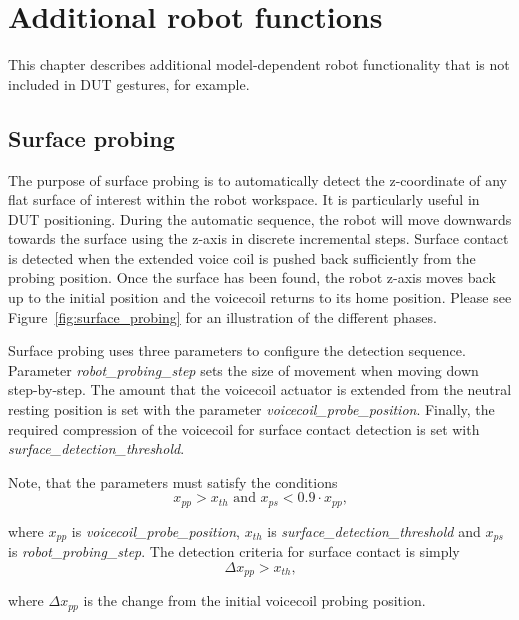 \chapter{Additional robot functions}
This chapter describes additional model-dependent robot functionality that is not included in DUT gestures, for example.

\section{Surface probing}

The purpose of surface probing is to automatically detect the z-coordinate of any flat surface of interest within the robot workspace. It is particularly useful in DUT positioning. During the automatic sequence, the robot will move downwards towards the surface using the z-axis in discrete incremental steps. Surface contact is detected when the extended voice coil is pushed back sufficiently from the probing position. Once the surface has been found, the robot z-axis moves back up to the initial position and the voicecoil returns to its home position. Please see Figure~\ref{fig:surface_probing} for an illustration of the different phases.

Surface probing uses three parameters to configure the detection sequence. Parameter \emph{robot\_probing\_step} sets the size of movement when moving down step-by-step. The amount that the voicecoil actuator is extended from the neutral resting position is set with the parameter \emph{voicecoil\_probe\_position}. Finally, the required compression of the voicecoil for surface contact detection is set with \emph{surface\_detection\_threshold}.

Note, that the parameters must satisfy the conditions
\[ x_{pp} > x_{th} \text{ and } x_{ps} < 0.9 \cdot x_{pp} \text{,}\]

where $x_{pp}$ is \emph{voicecoil\_probe\_position}, $x_{th}$ is \emph{surface\_detection\_threshold} and $x_{ps}$ is \emph{robot\_probing\_step}. The detection criteria for surface contact is simply
\[\Delta x_{pp} > x_{th} \text{,}\]

where $\Delta x_{pp}$ is the change from the initial voicecoil probing position.


